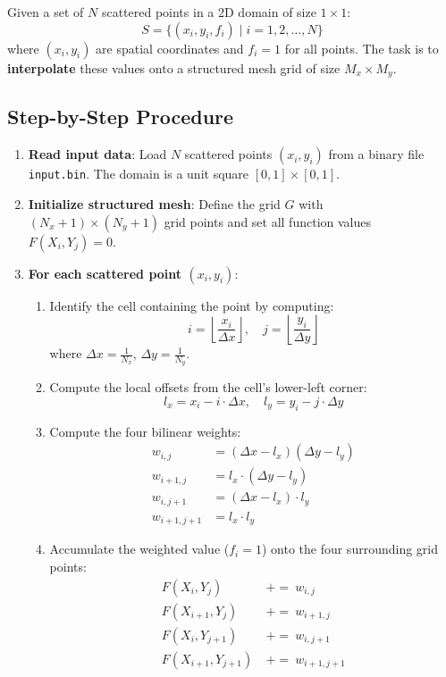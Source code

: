 \documentclass[12pt,a4paper]{article}
\begin{document}
Given a set of $N$ scattered points in a 2D domain of size $1 \times 1$:
\[
S = \{(x_i, y_i, f_i) \mid i = 1, 2, \ldots, N\}
\]
where $(x_i, y_i)$ are spatial coordinates and $f_i = 1$ for all points. The task is to \textbf{interpolate} these values onto a structured mesh grid of size $M_x \times M_y$.

\subsection{Step-by-Step Procedure}

\begin{enumerate}
    \item \textbf{Read input data}: Load $N$ scattered points $(x_i, y_i)$ from a binary file \texttt{input.bin}. The domain is a unit square $[0,1] \times [0,1]$.
    
    \item \textbf{Initialize structured mesh}: Define the grid $G$ with $(N_x + 1) \times (N_y + 1)$ grid points and set all function values $F(X_i, Y_j) = 0$.
    
    \item \textbf{For each scattered point $(x_i, y_i)$}:
    \begin{enumerate}
        \item Identify the cell containing the point by computing:
        \[
        i = \left\lfloor \frac{x_i}{\Delta x} \right\rfloor, \quad j = \left\lfloor \frac{y_i}{\Delta y} \right\rfloor
        \]
        where $\Delta x = \frac{1}{N_x}$, $\Delta y = \frac{1}{N_y}$.
        
        \item Compute the local offsets from the cell's lower-left corner:
        \[
        l_x = x_i - i \cdot \Delta x, \quad l_y = y_i - j \cdot \Delta y
        \]
        
        \item Compute the four bilinear weights:
        \begin{align}
            w_{i,j} &= (\Delta x - l_x)(\Delta y - l_y) \\
            w_{i+1,j} &= l_x \cdot (\Delta y - l_y) \\
            w_{i,j+1} &= (\Delta x - l_x) \cdot l_y \\
            w_{i+1,j+1} &= l_x \cdot l_y
        \end{align}
        
        \item Accumulate the weighted value ($f_i = 1$) onto the four surrounding grid points:
        \begin{align}
            F(X_i, Y_j) &\ {+}{=}\ w_{i,j} \\
            F(X_{i+1}, Y_j) &\ {+}{=}\ w_{i+1,j} \\
            F(X_i, Y_{j+1}) &\ {+}{=}\ w_{i,j+1} \\
            F(X_{i+1}, Y_{j+1}) &\ {+}{=}\ w_{i+1,j+1}
        \end{align}
    \end{enumerate}
    

\end{enumerate}
\end{document}
